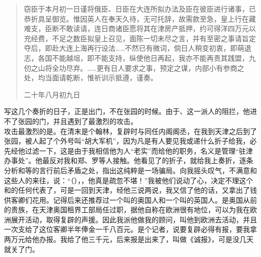 \begin{quote}
窃臣于本月初一日谨将俄臣、日臣在大连所拟办法及臣在彼臣进行诸事，已恭折具呈御览。惟因英人在奉天久待，无可托辞，故需款至急，皇上行在藏难支，臣断不敢读请，连日商诸臣愿将其在津房产抵押，约可得洋四万元以充经费，不足之数臣拟皇上召见，面陈一切未尽之言，并有至密之事请旨定夺后，即赴大连上海再行设法……不然已有微词，倘日人稍变初衷，即萌退志，各国不能越俎，即不能支持，纵使他日再起，我亦不能再责其践盟，九仞之山将全功尽弃。……更有日人要求之事，预定之谋，内部小有参商之处，均当面请乾断，惟祈训示抵遵，谨奏。\\

\begin{flushright}
	二十年八月初九日\\
\end{flushright}
\end{quote}

写这几个奏折的日子，正是出门，不在张园的时候。由于、这一派人的阻拦，他进不了张园的门，并且遇到了最激烈的攻击。\\

攻击最激烈的是。在清末是个翰林，复辟时与同任内阁阁丞，在我到天津之后到了张园，被人起了个外号叫“胡大军机”，因为凡是有人要见我或递什么折子给我，必先经他过滤一下，这是由于我相信他为人“老实”而给他的职务，名义是管理“驻津办事处”。他最反对我和郑、罗等人接触。他看见了的折子，就给我上奏折，逐条分析和等的言行前后矛盾之处，指出这纯粹是一场骗局。向我摇头叹气，不满意和这些人的来往，说：“（），，他真是疏忽不堪！”我被他们说动了心，决定不理这个和的任何代表了，可是一回到天津，经他三说两说，我又信了他的话，又拿出了钱供客卿们花用。记得后来还推荐过一个叫的奥国人和一个叫的英国人。是奥国从前的贵族，在天津奥国租界工部局任过职，据他自称在欧洲很有地位，可以为我在欧洲展开活动，取得复辟的声援。因此我派他做我的顾问，叫他到欧洲去活动，并且一次支给了这位客卿半年俸金一千八百元。是个记者，说要复辟必得有报，要我拿两万元给他办报。我给了他三千元，后来报是出来了，叫做《诚报》，可是没几天就关了门。\\

